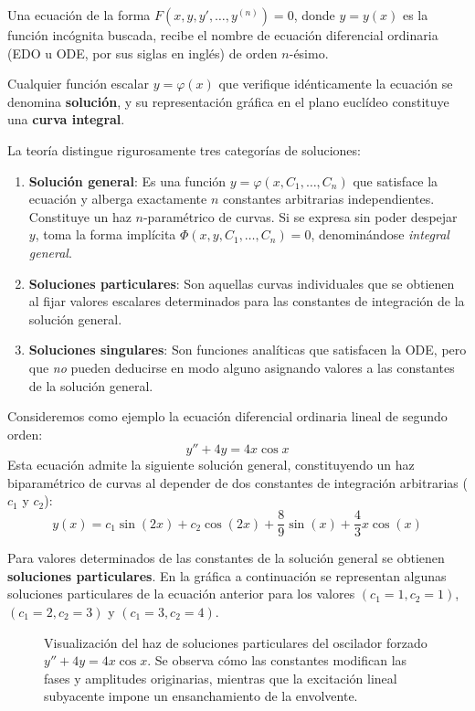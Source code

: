 \begin{definicion}
Una ecuación de la forma $F(x, y, y', \dots, y^{(n)}) = 0$, donde $y = y(x)$ es la función incógnita buscada, recibe el nombre de ecuación diferencial ordinaria (EDO u ODE, por sus siglas en inglés) de orden $n$-ésimo.
\end{definicion}

Cualquier función escalar $y = \varphi(x)$ que verifique idénticamente la ecuación se denomina \textbf{solución}, y su representación gráfica en el plano euclídeo constituye una \textbf{curva integral}.

La teoría distingue rigurosamente tres categorías de soluciones:
\begin{enumerate}
    \item \textbf{Solución general}: Es una función $y = \varphi(x, C_1, \dots, C_n)$ que satisface la ecuación y alberga exactamente $n$ constantes arbitrarias independientes. Constituye un haz $n$-paramétrico de curvas. Si se expresa sin poder despejar $y$, toma la forma implícita $\Phi(x, y, C_1, \dots, C_n) = 0$, denominándose \textit{integral general}.
    \item \textbf{Soluciones particulares}: Son aquellas curvas individuales que se obtienen al fijar valores escalares determinados para las constantes de integración de la solución general.
    \item \textbf{Soluciones singulares}: Son funciones analíticas que satisfacen la ODE, pero que \textit{no} pueden deducirse en modo alguno asignando valores a las constantes de la solución general.
\end{enumerate}

\vspace{0.5cm}

\begin{ejemplo}
Consideremos como ejemplo la ecuación diferencial ordinaria lineal de segundo orden:
$$ y'' + 4y = 4x \cos x $$
Esta ecuación admite la siguiente solución general, constituyendo un haz biparamétrico de curvas al depender de dos constantes de integración arbitrarias ($c_1$ y $c_2$):
$$ y(x) = c_1 \sin(2x) + c_2 \cos(2x) + \frac{8}{9}\sin(x) + \frac{4}{3}x \cos(x) $$

Para valores determinados de las constantes de la solución general se obtienen \textbf{soluciones particulares}. En la gráfica a continuación se representan algunas soluciones particulares de la ecuación anterior para los valores $(c_1 = 1, c_2 = 1)$, $(c_1 = 2, c_2 = 3)$ y $(c_1 = 3, c_2 = 4)$.

\begin{figure}[H]
    \centering
    
    \caption{Visualización del haz de soluciones particulares del oscilador forzado $y'' + 4y = 4x \cos x$. Se observa cómo las constantes modifican las fases y amplitudes originarias, mientras que la excitación lineal subyacente impone un ensanchamiento de la envolvente.}
\end{figure}
\end{ejemplo}

